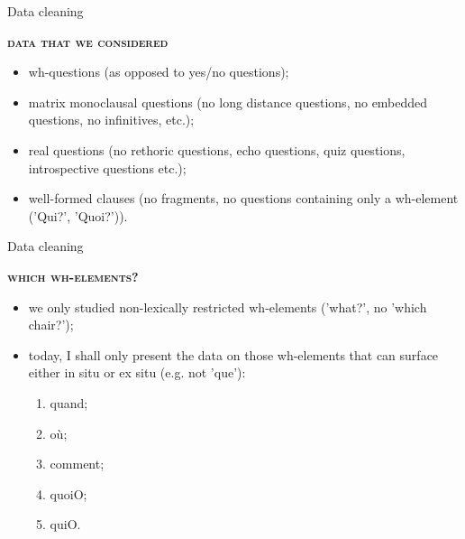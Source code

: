 \documentclass[lesson_slides]{subfiles}
\begin{document}
\begin{frame}[c]{Data cleaning}

    \textbf{\textsc{data that we considered}} \pause
    
    \begin{itemize}
        \item[\ding{227}] wh-questions \pause (as opposed to yes/no questions); \pause
        \item[\ding{227}] matrix monoclausal questions \pause (no long distance questions, no embedded questions, no infinitives, etc.); \pause
        \item[\ding{227}] real questions \pause (no rethoric questions, echo questions, quiz questions, introspective questions etc.); \pause
        \item[\ding{227}] well-formed clauses \pause (no fragments, no questions containing only a wh-element ('Qui?', 'Quoi?')).
    \end{itemize}
    
\end{frame}
\begin{frame}[c]{Data cleaning}

    \textbf{\textsc{which wh-elements?}} \pause
    
    \begin{itemize}
        \item[\ding{227}] we only studied non-lexically restricted wh-elements ('what?', no 'which chair?'); \pause
        \item[\ding{227}] today, I shall only present the data on those wh-elements that can surface either in situ or ex situ (e.g. not 'que'): \pause
        \begin{enumerate}
            \item quand; \pause
            \item où; \pause
            \item comment; \pause
            \item quoiO; \pause
            \item quiO.
        \end{enumerate}
    \end{itemize}
    
\end{frame}
\end{document}

